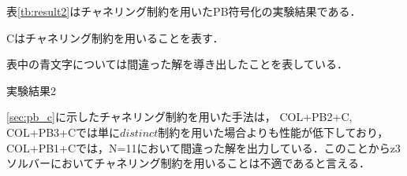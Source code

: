 表\ref{tb:result2}はチャネリング制約を用いたPB符号化の実験結果である．

Cはチャネリング制約を用いることを表す．

表中の青文字については間違った解を導き出したことを表している．
\begin{table}[htb]
    \caption{実験結果2}
{\tiny \label{tb:result2}}
\end{table}

\ref{sec:pb_c}に示したチャネリング制約を用いた手法は，
COL+PB2+C, COL+PB3+Cでは単に$distinct$制約を用いた場合よりも性能が低下しており，
COL+PB1+Cでは，N=11において間違った解を出力している．このことからz3ソルバーにおいてチャネリング制約を用いることは不適であると言える．


